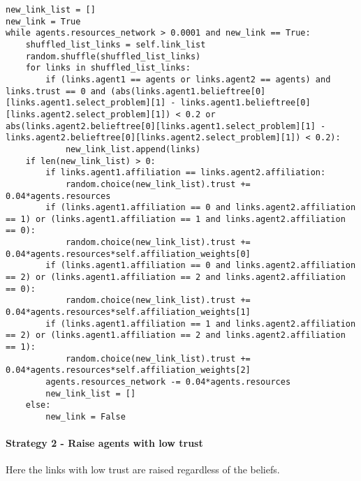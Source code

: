 \begin{lstlisting}
new_link_list = []
new_link = True
while agents.resources_network > 0.0001 and new_link == True:
	shuffled_list_links = self.link_list
	random.shuffle(shuffled_list_links)
	for links in shuffled_list_links:
		if (links.agent1 == agents or links.agent2 == agents) and links.trust == 0 and (abs(links.agent1.belieftree[0][links.agent1.select_problem][1] - links.agent1.belieftree[0][links.agent2.select_problem][1]) < 0.2 or abs(links.agent2.belieftree[0][links.agent1.select_problem][1] - links.agent2.belieftree[0][links.agent2.select_problem][1]) < 0.2):
			new_link_list.append(links)
	if len(new_link_list) > 0:
		if links.agent1.affiliation == links.agent2.affiliation:
			random.choice(new_link_list).trust += 0.04*agents.resources
		if (links.agent1.affiliation == 0 and links.agent2.affiliation == 1) or (links.agent1.affiliation == 1 and links.agent2.affiliation == 0):
			random.choice(new_link_list).trust += 0.04*agents.resources*self.affiliation_weights[0]
		if (links.agent1.affiliation == 0 and links.agent2.affiliation == 2) or (links.agent1.affiliation == 2 and links.agent2.affiliation == 0):
			random.choice(new_link_list).trust += 0.04*agents.resources*self.affiliation_weights[1]
		if (links.agent1.affiliation == 1 and links.agent2.affiliation == 2) or (links.agent1.affiliation == 2 and links.agent2.affiliation == 1):
			random.choice(new_link_list).trust += 0.04*agents.resources*self.affiliation_weights[2]
		agents.resources_network -= 0.04*agents.resources
		new_link_list = []
	else:
		new_link = False
\end{lstlisting}

\paragraph{Strategy 2 - Raise agents with low trust}

Here the links with low trust are raised regardless of the beliefs.

